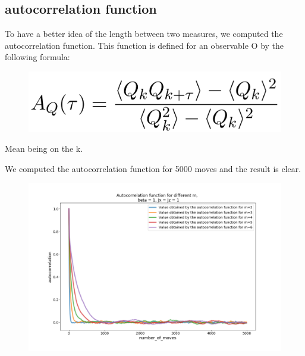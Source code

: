 \documentclass[a4paper,12pt,twoside]{article}
\begin{document}
	 
	 \subsection{autocorrelation function}
	 To have a better idea of the length between two measures, we computed the autocorrelation function. This function is defined for an observable O by the following formula:
	\begin{figure}[!h]
			 	\centering
			 	
			 	\includegraphics[scale=0.25]{autocorformula.png}
		
	\end{figure}
		
	Mean being on the k.
	
	We computed the autocorrelation function for 5000 moves and the result is clear.
	\begin{figure}[!h]
		\centering
		
		\includegraphics[scale=0.4]{autocorrelation_functionx=z=1_m2-6.png}
		
		
	\end{figure}
\end{document}
